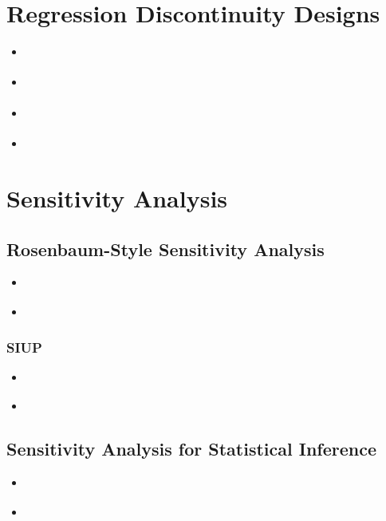 \documentclass[12pt,leqno]{article}
\theoremstyle{newstyle}
\begin{document}
\section{Regression Discontinuity Designs}

\begin{itemize}

\item \citet{lee2008}

\item \citet{caugheysekhon2011}

\item \citet{cattaneoetal2015}

\item \citet{saleshansen2014}

\end{itemize}

\section{Sensitivity Analysis}

\subsection{Rosenbaum-Style Sensitivity Analysis}

\begin{itemize}

\item \citet[Chapter 3]{rosenbaum2010}

\item \citet{rosenbaumsilber2009}

\end{itemize}

\subsubsection{SIUP}

\begin{itemize}

\item \citet{rosenbaum2008}

\item \citet{hansensales2015}

\end{itemize}

\subsection{Sensitivity Analysis for Statistical Inference}

\begin{itemize}

\item \citet{hhh2010}

\item \citet{imbens2003}

\end{itemize}

\newpage


\begin{singlespace}
\end{singlespace}
\end{document}
